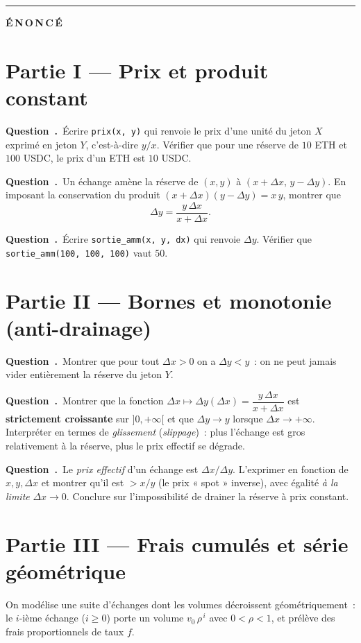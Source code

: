\documentclass[11pt,a4paper]{article}
\newcounter{qcnt}
\newcommand{\Q}{\medskip\par\stepcounter{qcnt}\noindent\textbf{Question~\theqcnt.}~}
\newcommand{\code}[1]{\lstinline!#1!}
\begin{document}
\bigskip
\hrule
\bigskip
{\Large\bfseries É\,N\,O\,N\,C\,É}
\medskip

\section*{Partie I --- Prix et produit constant}

\Q Écrire \code{prix(x, y)} qui renvoie le prix d'une unité du jeton $X$ exprimé en jeton $Y$,
c'est-à-dire $y/x$. Vérifier que pour une réserve de $10$ ETH et $100$ USDC, le prix d'un ETH est
$10$ USDC.

\Q Un échange amène la réserve de $(x, y)$ à $(x + \Delta x,\, y - \Delta y)$. En imposant la
conservation du produit $(x+\Delta x)(y-\Delta y) = x\,y$, montrer que
$$\Delta y = \frac{y\,\Delta x}{x + \Delta x}.$$

\Q Écrire \code{sortie_amm(x, y, dx)} qui renvoie $\Delta y$. Vérifier que
\code{sortie_amm(100, 100, 100)} vaut $50$.

\section*{Partie II --- Bornes et monotonie (anti-drainage)}

\Q Montrer que pour tout $\Delta x > 0$ on a $\Delta y < y$~: on ne peut jamais vider entièrement
la réserve du jeton $Y$.

\Q Montrer que la fonction $\Delta x \mapsto \Delta y(\Delta x) = \dfrac{y\,\Delta x}{x+\Delta x}$
est \textbf{strictement croissante} sur $]0, +\infty[$ et que $\Delta y \to y$ lorsque
$\Delta x \to +\infty$. Interpréter en termes de \emph{glissement} (\emph{slippage})~: plus
l'échange est gros relativement à la réserve, plus le prix effectif se dégrade.

\Q Le \emph{prix effectif} d'un échange est $\Delta x / \Delta y$. L'exprimer en fonction de
$x, y, \Delta x$ et montrer qu'il est $> x/y$ (le prix « spot » inverse), avec égalité
\emph{à la limite} $\Delta x \to 0$. Conclure sur l'impossibilité de drainer la réserve à prix
constant.

\section*{Partie III --- Frais cumulés et série géométrique}

On modélise une suite d'échanges dont les volumes décroissent géométriquement~: le $i$-ième
échange ($i \ge 0$) porte un volume $v_0\,\rho^{\,i}$ avec $0 < \rho < 1$, et prélève des frais
proportionnels de taux $f$.
\end{document}
